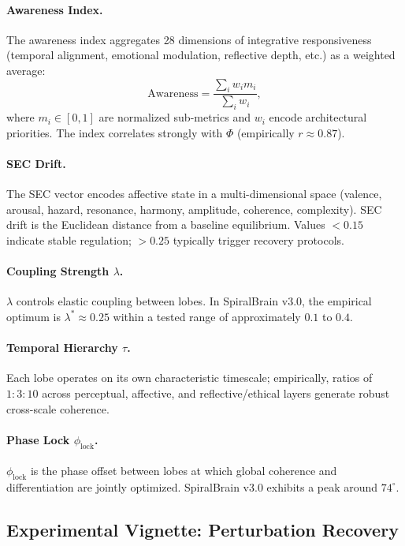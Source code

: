\documentclass[11pt,a4paper]{article}
\begin{document}
\paragraph{Awareness Index.}
The awareness index aggregates 28 dimensions of integrative responsiveness (temporal alignment, emotional modulation, reflective depth, etc.) as a weighted average:
\[
\text{Awareness} = \frac{\sum_i w_i m_i}{\sum_i w_i},
\]
where \( m_i \in [0,1] \) are normalized sub-metrics and \( w_i \) encode architectural priorities. The index correlates strongly with \( \Phi \) (empirically \( r \approx 0.87 \)).

\paragraph{SEC Drift.}
The SEC vector encodes affective state in a multi-dimensional space (valence, arousal, hazard, resonance, harmony, amplitude, coherence, complexity). SEC drift is the Euclidean distance from a baseline equilibrium. Values \( < 0.15 \) indicate stable regulation; \( > 0.25 \) typically trigger recovery protocols.

\paragraph{Coupling Strength \( \lambda \).}
\( \lambda \) controls elastic coupling between lobes. In SpiralBrain v3.0, the empirical optimum is \( \lambda^{*} \approx 0.25 \) within a tested range of approximately \( 0.1 \) to \( 0.4 \).

\paragraph{Temporal Hierarchy \( \tau \).}
Each lobe operates on its own characteristic timescale; empirically, ratios of \( 1:3:10 \) across perceptual, affective, and reflective/ethical layers generate robust cross-scale coherence.

\paragraph{Phase Lock \( \phi_{\text{lock}} \).}
\( \phi_{\text{lock}} \) is the phase offset between lobes at which global coherence and differentiation are jointly optimized. SpiralBrain v3.0 exhibits a peak around \( 74^\circ \).

\subsection{Experimental Vignette: Perturbation Recovery}
\end{document}
